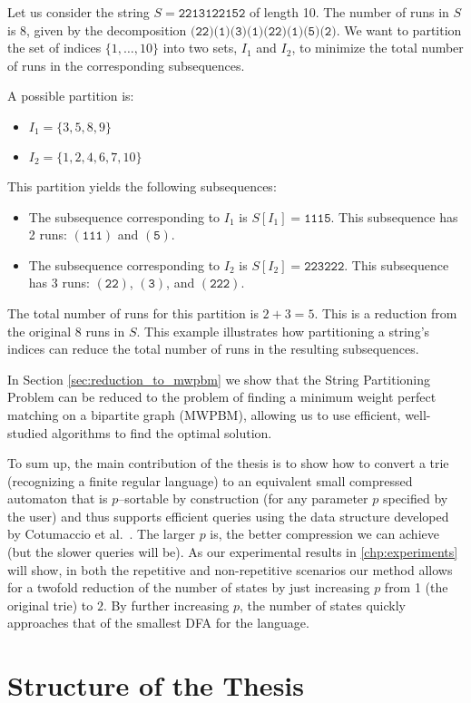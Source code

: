 \begin{example}
\label{ex:string-partitioning}
    Let us consider the string $S = \texttt{2213122152}$ of length 10. The number of runs in $S$ is 8, given by the decomposition $\texttt{(22)(1)(3)(1)(22)(1)(5)(2)}$.
    We want to partition the set of indices $\{1, \dots, 10\}$ into two sets, $I_1$ and $I_2$, to minimize the total number of runs in the corresponding subsequences.

    A possible partition is:
    \begin{itemize}
        \item $I_1 = \{3, 5, 8, 9\}$
        \item $I_2 = \{1, 2, 4, 6, 7, 10\}$
    \end{itemize}

    This partition yields the following subsequences:
    \begin{itemize}
        \item The subsequence corresponding to $I_1$ is $S[I_1] = \texttt{1115}$. This subsequence has 2 runs: $(\texttt{111})$ and $(\texttt{5})$.
        \item The subsequence corresponding to $I_2$ is $S[I_2] = \texttt{223222}$. This subsequence has 3 runs: $(\texttt{22})$, $(\texttt{3})$, and $(\texttt{222})$.
    \end{itemize}

    The total number of runs for this partition is $2 + 3 = 5$. This is a reduction from the original 8 runs in $S$. This example illustrates how partitioning a string's indices can reduce the total number of runs in the resulting subsequences.
\end{example}

In Section \ref{sec:reduction_to_mwpbm} we show that the String Partitioning Problem can be reduced to the problem of finding a minimum weight perfect matching on a bipartite graph (MWPBM), allowing us to use efficient, well-studied algorithms to find the optimal solution. 

To sum up, the main contribution of the thesis is to show how to convert a trie (recognizing a finite regular language) to an equivalent small compressed automaton that is $p$--sortable by construction (for any parameter $p$ specified by the user) and thus supports efficient queries using the data structure developed by Cotumaccio et al.~\cite{cotumaccio2023co}. 
The larger $p$ is, the better compression we can achieve (but the slower queries will be).
As our experimental results in \cref{chp:experiments} will show, in both the repetitive and non-repetitive scenarios our method allows for a twofold reduction of the number of states by just increasing $p$ from 1 (the original trie) to $2$. By further increasing $p$, the number of states quickly approaches that of the smallest DFA for the language. 



\section{Structure of the Thesis}
